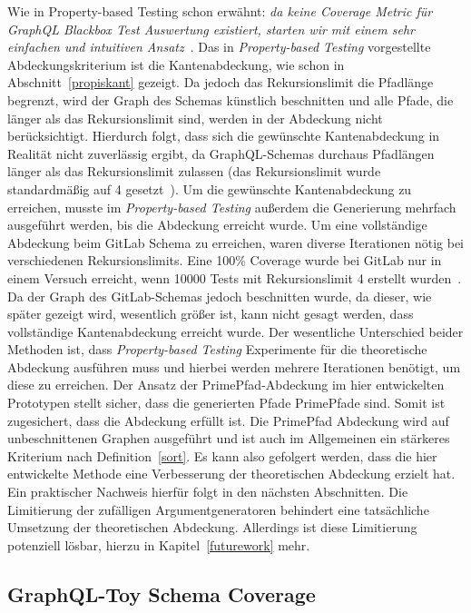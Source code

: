 Wie in Property-based Testing schon erwähnt: \textit{da keine Coverage Metric für GraphQL Blackbox Test Auswertung existiert, starten wir mit einem sehr
einfachen und intuitiven Ansatz}~\cite[vgl. B. Measuring Schema Coverage]{property-based-testing}.
Das in \textit{Property-based Testing} vorgestellte Abdeckungskriterium ist die Kantenabdeckung, wie schon in Abschnitt~\ref{propiskant} gezeigt.
Da jedoch das Rekursionslimit die Pfadlänge begrenzt, wird der Graph des Schemas künstlich beschnitten und alle Pfade, die länger als
das Rekursionslimit sind, werden in der Abdeckung nicht berücksichtigt.
Hierdurch folgt, dass sich die gewünschte Kantenabdeckung in Realität nicht zuverlässig ergibt, da GraphQL-Schemas durchaus Pfadlängen länger
als das Rekursionslimit zulassen (das Rekursionslimit wurde standardmäßig auf 4 gesetzt~\cite[vgl. SourceCode ]{property-based-testing}).
Um die gewünschte Kantenabdeckung zu erreichen, musste im \textit{Property-based Testing} außerdem die Generierung mehrfach ausgeführt werden, bis die Abdeckung erreicht wurde.
Um eine vollständige Abdeckung beim GitLab Schema zu erreichen, waren diverse Iterationen nötig bei verschiedenen Rekursionslimits.
Eine 100\% Coverage wurde bei GitLab nur in einem Versuch erreicht, wenn 10000 Tests mit Rekursionslimit 4 erstellt wurden~\cite[vgl. Tabelle 2]{property-based-testing}.
Da der Graph des GitLab-Schemas jedoch beschnitten wurde, da dieser, wie später gezeigt wird, wesentlich größer ist, kann nicht gesagt werden, dass vollständige Kantenabdeckung erreicht wurde.
Der wesentliche Unterschied beider Methoden ist, dass \textit{Property-based Testing} Experimente für die theoretische Abdeckung ausführen muss
und hierbei werden mehrere Iterationen benötigt, um diese zu erreichen.
Der Ansatz der PrimePfad-Abdeckung im hier entwickelten Prototypen stellt sicher, dass die generierten Pfade PrimePfade sind.
Somit ist zugesichert, dass die Abdeckung erfüllt ist.
Die PrimePfad Abdeckung wird auf unbeschnittenen Graphen ausgeführt und ist auch im Allgemeinen ein stärkeres Kriterium nach Definition~\ref{sort}.
Es kann also gefolgert werden, dass die hier entwickelte Methode eine Verbesserung der theoretischen Abdeckung erzielt hat.
Ein praktischer Nachweis hierfür folgt in den nächsten Abschnitten.
Die Limitierung der zufälligen Argumentgeneratoren behindert eine tatsächliche Umsetzung der theoretischen Abdeckung.
Allerdings ist diese Limitierung potenziell lösbar, hierzu in Kapitel~\ref{futurework} mehr.
\newpage

\subsection{GraphQL-Toy Schema Coverage}

